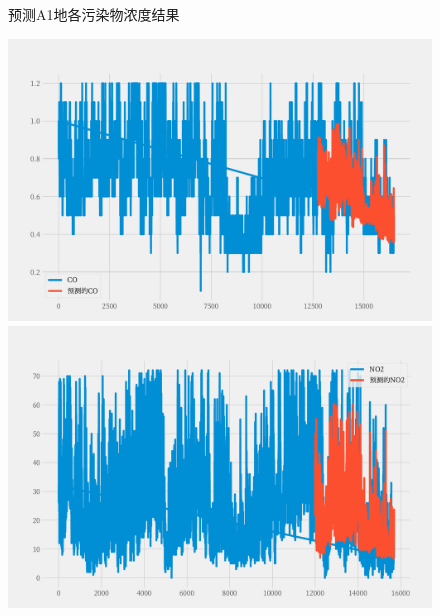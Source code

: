 \documentclass[a4paper,10pt]{my_paper}
\numberwithin{equation}{section}
\begin{document}
\begin{figure}[htbp]
\begin{minipage}[c]{0.3\textwidth}
		\end{minipage}
\caption{预测A1地各污染物浓度结果}\label{fig_Q4A1地预测图}
\end{figure}

\begin{figure}[htbp]
	\centering
		\begin{minipage}[c]{0.3\textwidth} %
			\centering
			\includegraphics[width=1\textwidth]{prob4/预测A2地_CO.pdf} %
		\end{minipage}%
		\begin{minipage}[c]{0.3\textwidth}
			\centering
			\includegraphics[width=1\textwidth]{prob4/预测A3地_NO2.pdf}
		\end{minipage}
		\begin{minipage}[c]{0.3\textwidth}
			\centering

\end{minipage}
\end{figure}
\end{document}
